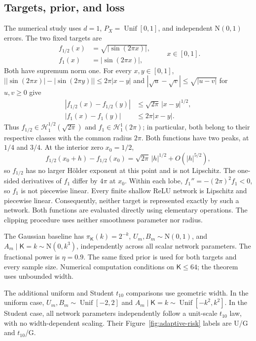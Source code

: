 \documentclass[11pt,a4paper]{article}
\theoremstyle{remark}
\newcommand{\Hcal}{\mathcal H}
\newcommand{\abs}[1]{\lvert#1\rvert}
\DeclareMathOperator{\Unif}{Unif}
\begin{document}
\subsection{Targets, prior, and loss}
The numerical study uses $d=1$, $P_X=\Unif[0,1]$, and independent
$\mathrm N(0,1)$ errors. {The two fixed targets are
\begin{equation}\label{eq:simulation-truth}
\begin{aligned}
f_{1/2}(x)&=\sqrt{\abs{\sin(2\pi x)}},\\
f_1(x)&=\abs{\sin(2\pi x)},
\end{aligned}
\qquad x\in[0,1].
\end{equation}
Both have supremum norm one. For every $x,y\in[0,1]$,
$\bigl|\abs{\sin(2\pi x)}-\abs{\sin(2\pi y)}\bigr|
\leq2\pi|x-y|$ and
$|\sqrt u-\sqrt v|\leq\sqrt{|u-v|}$ for $u,v\geq0$ give
\[
\begin{aligned}
|f_{1/2}(x)-f_{1/2}(y)|&\leq\sqrt{2\pi}\,|x-y|^{1/2},\\
|f_1(x)-f_1(y)|&\leq2\pi|x-y|.
\end{aligned}
\]
Thus $f_{1/2}\in\Hcal_1^{1/2}(\sqrt{2\pi})$ and
$f_1\in\Hcal_1^1(2\pi)$; in particular, both belong to their
respective classes with the common radius $2\pi$.
Both functions have two peaks, at $1/4$ and $3/4$.
At the interior zero $x_0=1/2$,
\[
f_{1/2}(x_0+h)-f_{1/2}(x_0)
=\sqrt{2\pi}\,|h|^{1/2}+O(|h|^{5/2}),
\]
so $f_{1/2}$ has no larger H\"older exponent at this point and is
not Lipschitz. The one-sided derivatives of $f_1$ differ by $4\pi$
at $x_0$. Within each lobe,
$f_1''=-(2\pi)^2f_1<0$, so $f_1$ is not piecewise linear.
Every finite shallow ReLU network is Lipschitz and piecewise linear.
Consequently, neither target is represented exactly by such a
network. Both functions are evaluated directly using elementary
operations.} The clipping procedure uses neither smoothness
parameter nor radius.

The Gaussian baseline has $\pi_{\mathsf K}(k)=2^{-k}$,
$U_m,B_m\sim\mathrm N(0,1)$, and
$A_m\mid\mathsf K=k\sim\mathrm N(0,k^3)$, {independently across all scalar network parameters.} The fractional power is $\eta=0.9$. The same fixed prior
is used for both targets and every sample size. Numerical computation
conditions on $\mathsf K\leq64$; the theorem uses unbounded width.

{The additional uniform and Student $t_{10}$ comparisons use
geometric width. In the uniform case, $U_m,B_m\sim\Unif[-2,2]$ and
$A_m\mid\mathsf K=k\sim\Unif[-k^2,k^2]$. In the Student case,
all network parameters independently follow a unit-scale $t_{10}$ law,
with no width-dependent scaling. Their Figure~\ref{fig:adaptive-risk}
labels are U/G and $t_{10}$/G.}
\end{document}
